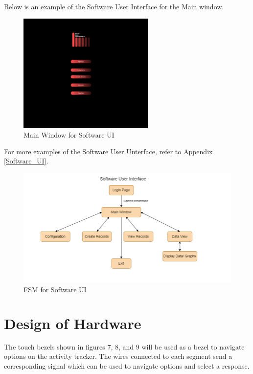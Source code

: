 \documentclass[12pt, titlepage]{article}
\begin{document}
Below is an example of the Software User Interface for the Main window.
\begin{figure}[H]
	\begin{center}
		 \includegraphics[width=0.6\textwidth]{MainWindow}
		\caption{Main Window for Software UI}
		\label{MainWindow} 
	\end{center}
\end{figure}

For more examples of the Software User Unterface, refer to Appendix \ref{Software_UI}.

\begin{figure}[H]
	\begin{center}
		 \includegraphics[width=1\textwidth]{SoftwareUI_FSM}
		\caption{FSM for Software UI}
		\label{SoftwareUI_FSM} 
	\end{center}
\end{figure}

\section{Design of Hardware}

The touch bezels shown in figures 7, 8, and 9 will be used as a bezel to navigate options on the activity tracker. The wires connected to each segment send a corresponding signal which can be used to navigate options and select a response.
\end{document}
